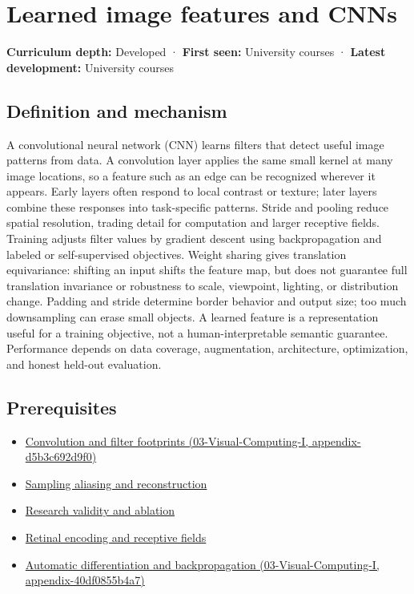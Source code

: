 \hypertarget{appendix-47c51ea026fb}{}
\section{Learned image features and CNNs}\label{appendix-47c51ea026fb-learned-image-features-and-cnns}

\textbf{Curriculum depth:} Developed · \textbf{First seen:} University courses · \textbf{Latest development:} University courses

\subsection{Definition and mechanism}\label{appendix-47c51ea026fb-definition-and-mechanism}

A convolutional neural network (CNN) learns filters that detect useful image patterns from data. A convolution layer applies the same small kernel at many image locations, so a feature such as an edge can be recognized wherever it appears. Early layers often respond to local contrast or texture; later layers combine these responses into task-specific patterns. Stride and pooling reduce spatial resolution, trading detail for computation and larger receptive fields. Training adjusts filter values by gradient descent using backpropagation and labeled or self-supervised objectives. Weight sharing gives translation equivariance: shifting an input shifts the feature map, but does not guarantee full translation invariance or robustness to scale, viewpoint, lighting, or distribution change. Padding and stride determine border behavior and output size; too much downsampling can erase small objects. A learned feature is a representation useful for a training objective, not a human-interpretable semantic guarantee. Performance depends on data coverage, augmentation, architecture, optimization, and honest held-out evaluation.

\subsection{Prerequisites}\label{appendix-47c51ea026fb-prerequisites}

\begin{itemize}
\tightlist
\item
  \href{../03-Visual-Computing-I/main.pdf\#nameddest=appendix-d5b3c692d9f0}{Convolution and filter footprints (03-Visual-Computing-I, appendix-d5b3c692d9f0)}
\item
  \hyperref[appendix-6a7869dd79a6]{Sampling aliasing and reconstruction}
\item
  \hyperref[appendix-65788587ef78]{Research validity and ablation}
\item
  \hyperref[appendix-7281c15ac44a]{Retinal encoding and receptive fields}
\item
  \href{../03-Visual-Computing-I/main.pdf\#nameddest=appendix-40df0855b4a7}{Automatic differentiation and backpropagation (03-Visual-Computing-I, appendix-40df0855b4a7)}
\end{itemize}

